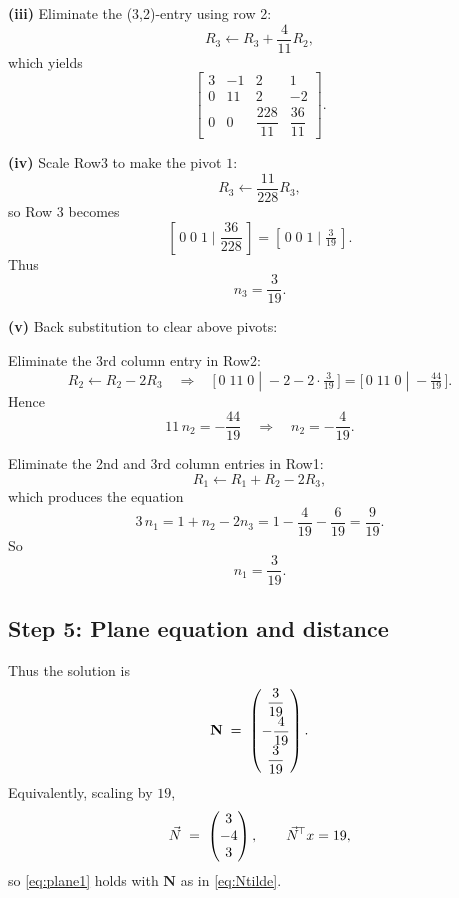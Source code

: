 \documentclass[12pt]{article}
\begin{document}
\medskip

\noindent\textbf{(iii)} Eliminate the (3,2)-entry using row 2:
\[
R_3 \leftarrow R_3 + \frac{4}{11}R_2,
\]
which yields
\begin{equation}
\left[
\begin{array}{ccc|c}
3 & -1 & 2 & 1\\[6pt]
0 & 11 & 2 & -2\\[8pt]
0 & 0 & \dfrac{228}{11} & \dfrac{36}{11}
\end{array}
\right].
\label{eq:aug3}
\end{equation}

\medskip

\noindent\textbf{(iv)} Scale Row3 to make the pivot \(1\):
\[
R_3 \leftarrow \frac{11}{228}R_3,
\]
so Row 3 becomes
\begin{equation}
\left[\,0\; 0\; 1\; \big|\; \frac{36}{228}\,\right] = [\,0\;0\;1\;|\; \tfrac{3}{19}\,].
\label{eq:aug4}
\end{equation}
Thus
\begin{equation}
n_3 = \frac{3}{19}.
\label{eq:n3}
\end{equation}

\medskip

\noindent\textbf{(v)} Back substitution to clear above pivots:

Eliminate the 3rd column entry in Row2:
\[
R_2 \leftarrow R_2 - 2R_3 \quad\Longrightarrow\quad
\big[\,0\;11\;0\;|\;-2 - 2\cdot\tfrac{3}{19}\,\big] = \big[\,0\;11\;0\;|\;-\tfrac{44}{19}\,\big].
\]
Hence
\begin{equation}
11\,n_2 = -\frac{44}{19}\quad\Longrightarrow\quad
n_2 = -\frac{4}{19}.
\label{eq:n2}
\end{equation}

Eliminate the 2nd and 3rd column entries in Row1:
\[
R_1 \leftarrow R_1 + R_2 - 2R_3,
\]
which produces the equation
\begin{equation}
3\,n_1 = 1 + n_2 - 2n_3 = 1 -\frac{4}{19} - \frac{6}{19} = \frac{9}{19}.
\end{equation}
So
\begin{equation}
n_1 = \frac{3}{19}.
\label{eq:n1}
\end{equation}

\subsection*{Step 5: Plane equation and distance}
Thus the solution is
\begin{equation}
\mathbf{N} \;=\; \begin{pmatrix}\dfrac{3}{19}\\[4pt] -\dfrac{4}{19}\\[4pt] \dfrac{3}{19}\end{pmatrix}.
\label{eq:Ntilde}
\end{equation}
Equivalently, scaling by \(19\),
\begin{equation}
\Vec{N} \;=\; \begin{pmatrix}3\\-4\\3\end{pmatrix}, \qquad
\Vec{N}^{\!\top} x = 19,
\label{eq:Nscaled}
\end{equation}
so \eqref{eq:plane1} holds with \(\mathbf{N}\) as in \eqref{eq:Ntilde}.
\end{document}
